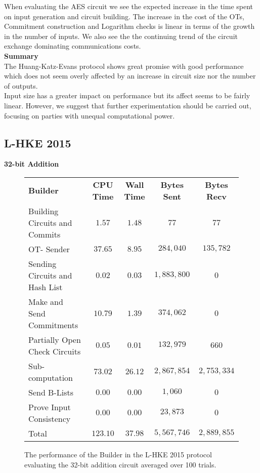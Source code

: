 \documentclass[ %
                    author={Nicholas Tutte},
                supervisor={Prof. Nigel Smart},
                    degree={MEng},
                     title={Secure Two Party Computation},
                  subtitle={A practical comparison of recent protocols},
                      type={Research - GG1K},
                      year={2015} ]{dissertation}
\begin{document}
				When evaluating the AES circuit we see the expected increase in the time spent on input generation and circuit building. The increase in the cost of the OTs, Commitment construction and Logarithm checks is linear in terms of the growth in the number of inputs. We also see the the continuing trend of the circuit exchange dominating communications costs.\\

				\noindent\textbf{Summary}\\

				The Huang-Katz-Evans protocol shows great promise with good performance which does not seem overly affected by an increase in circuit size nor the number of outputs.\\

				Input size has a greater impact on performance but its affect seems to be fairly linear. However, we suggest that further experimentation should be carried out, focusing on parties with unequal computational power.\\

				

			\subsection{L-HKE 2015}
				\FloatBarrier
				\noindent \textbf{32-bit Addition}
				\begin{figure}[!ht]
					\begin{tabular}{| p{4.3cm} | c c c c |}
						\hline
						\textbf{Builder} & \textbf{CPU Time} & \textbf{Wall Time} & \textbf{Bytes Sent} & \textbf{Bytes Recv} \\
						\thickhline
						Building Circuits and Commits & $1.57$ & $1.48$ & $77$ & $77$ \\
						\hline
						OT- Sender & $37.65$ & $8.95$ & $284,040$ & $135,782$ \\
						\hline
						Sending Circuits and Hash List & $0.02$ & $0.03$ & $1,883,800$ & $0$ \\
						\hline
						Make and Send Commitments & $10.79$ & $1.39$ & $374,062$ & $0$ \\
						\hline
						Partially Open Check Circuits & $0.05$ & $0.01$ & $132,979$ & $660$ \\
						\hline
						Sub-computation & $73.02$ & $26.12$ & $2,867,854$ & $2,753,334$ \\
						\hline
						Send B-Lists & $0.00$ & $0.00$ & $1,060$ & $0$ \\
						\hline
						Prove Input Consistency & $0.00$ & $0.00$ & $23,873$ & $0$ \\
						\thickhline
						Total & $123.10$ & $37.98$ & $5,567,746$ & $2,889,855$ \\
						\hline
					\end{tabular}
					\caption{The performance of the Builder in the L-HKE 2015 protocol evaluating the 32-bit addition circuit averaged over 100 trials. \label{table:L-HKE_2015_Add_Builder}}
				\end{figure}
\end{document}
